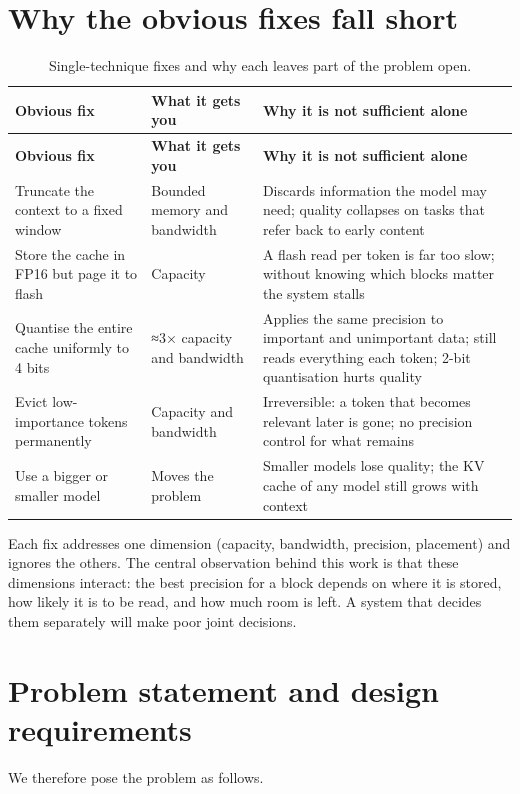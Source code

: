 \documentclass[12pt,a4paper]{report}
\begin{document}
\section{Why the obvious fixes fall short}\label{sec:1_5}
{\fontsize{8}{9.5}\selectfont\setlength{\tabcolsep}{3pt}
\begin{longtable}{>{\raggedright\arraybackslash}p{1.54in}>{\raggedright\arraybackslash}p{1.45in}>{\raggedright\arraybackslash}p{2.98in}}
\caption{Single-technique fixes and why each leaves part of the problem open.}\\
\toprule
\textbf{Obvious fix} & \textbf{What it gets you} & \textbf{Why it is not sufficient alone} \\\midrule\endfirsthead
\toprule \textbf{Obvious fix} & \textbf{What it gets you} & \textbf{Why it is not sufficient alone} \\\midrule\endhead
\bottomrule\endfoot
Truncate the context to a fixed window & Bounded memory and bandwidth & Discards information the model may need; quality collapses on tasks that refer back to early content \\
Store the cache in FP16 but page it to flash & Capacity & A flash read per token is far too slow; without knowing which blocks matter the system stalls \\
Quantise the entire cache uniformly to 4 bits & ≈3× capacity and bandwidth & Applies the same precision to important and unimportant data; still reads everything each token; 2-bit quantisation hurts quality \\
Evict low-importance tokens permanently & Capacity and bandwidth & Irreversible: a token that becomes relevant later is gone; no precision control for what remains \\
Use a bigger or smaller model & Moves the problem & Smaller models lose quality; the KV cache of any model still grows with context \\
\bottomrule
\end{longtable}}
Each fix addresses one dimension (capacity, bandwidth, precision, placement) and ignores the others. The central observation behind this work is that these dimensions interact: the best precision for a block depends on where it is stored, how likely it is to be read, and how much room is left. A system that decides them separately will make poor joint decisions.

\section{Problem statement and design requirements}\label{sec:1_6}
We therefore pose the problem as follows.
\end{document}
